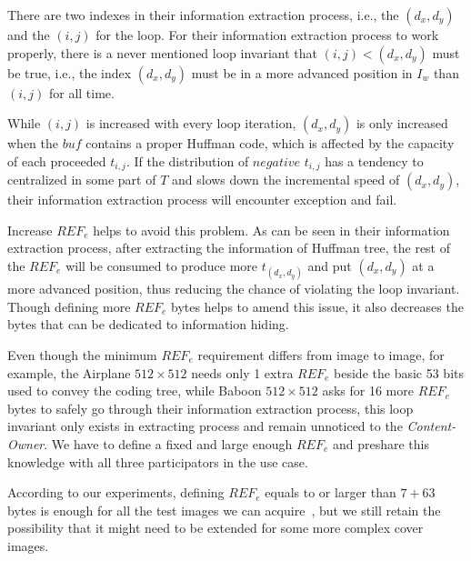 There are two indexes in 
their information extraction process, 
i.e., the $(d_x, d_y)$ 
and the $(i, j)$ for the loop.
For 
their information extraction process
to work properly, there is a never mentioned loop invariant  
that $(i, j) < (d_x, d_y)$ must be true, i.e., the index $(d_x, d_y)$ must be in a more advanced position in $I_w$ than $(i, j)$ for all time.

While $(i, j)$ is increased with every loop iteration, $(d_x, d_y)$ is only increased when the $buf$ 
contains a proper Huffman code, which is affected by the capacity of each proceeded $t_{i, j}$.
If the distribution of $negative$ $t_{i, j}$ has a tendency to centralized in some part of $T$ and slows down the incremental speed of $(d_x, d_y)$, 
their information extraction process
will encounter exception and fail.

Increase $REF_e$ helps to avoid this problem. 
As can be seen 
in their information extraction process,
after extracting the information of Huffman tree, the rest of the $REF_e$ will be consumed to produce more $t_{(d_x, d_y)}$ and put $(d_x, d_y)$ at a more advanced position, thus reducing the chance of violating the loop invariant.
Though defining more $REF_e$ bytes helps to amend this issue, it also decreases the bytes that can be dedicated to information hiding.

Even though the minimum $REF_e$ requirement differs from image to image, for example, the Airplane $512 \times 512$ needs only 1 extra $REF_e$ beside the basic 53 bits used to convey the coding tree, while Baboon $512 \times 512$ asks for 16 more $REF_e$ bytes to safely go through 
their information extraction process, 
this loop invariant only exists in extracting process and remain unnoticed to the \emph{Content-Owner}.
We have to define a fixed and large enough $REF_e$ and preshare this knowledge with all three participators in the use case. 

According to our experiments, defining $REF_e$ equals to or larger than $7 + 63$ bytes is enough for all the test images we can acquire~\cite{UniversityofSouthernCalifornia2020, Bas2011, bows2007}, but we still retain the possibility that it might need to be extended for some more complex cover images.



















